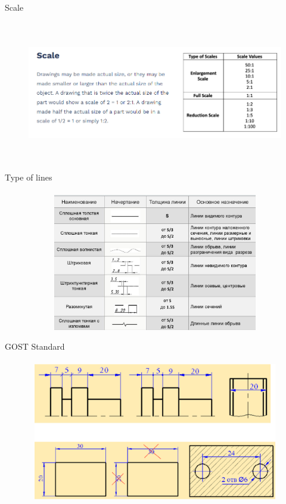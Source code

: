 \documentclass[aspectratio=169]{beamer}
\begin{document}
\begin{frame}[t]{Scale}
    \framesubtitle{}
    \vspace{-0.6cm}
    \begin{figure}[H]
        \centering\includegraphics[height=6cm,width=1\textwidth,keepaspectratio]{resources/scale.png}
        \label{fig:resources/scale.png}
    \end{figure}
\end{frame}

\begin{frame}[t]{Type of lines}
    \framesubtitle{}
    \vspace{-0.6cm}
    \begin{figure}[H]
        \centering\includegraphics[height=6cm,width=1\textwidth,keepaspectratio]{resources/types_of_lines.jpg}
        \label{fig:resources/types_of_lines.jpg}
    \end{figure}
\end{frame}

\begin{frame}[t]{GOST Standard}
    \framesubtitle{}
    \vspace{-0.6cm}
    \begin{figure}[H]
        \centering\includegraphics[height=6cm,width=1\textwidth,keepaspectratio]{resources/st1.png}
        \label{fig:resources/st1.png}
    \end{figure}
\end{frame}
\end{document}
